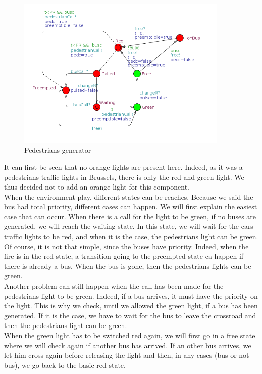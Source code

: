 \begin{figure}[!ht]\label{fig:crosswalk}
  \centering
    \includegraphics[width=0.9\textwidth]{picture/crosswalk.png}
    \caption{Pedestrians generator}
\end{figure}
\noindent It can first be seen that no orange lights are present here. Indeed, as it was a pedestrians traffic lights in Brussels, there is only the red and green light. We thus decided not to add an orange light for this component. \\
When the environment play, different states can be reaches. Because we said the bus had total priority, different cases can happen. We will first explain the easiest case that can occur. When there is a call for the light to be green, if no buses are generated, we will reach the waiting state. In this state, we will wait for the cars traffic lights to be red, and when it is the case, the pedestrians light can be green. Of course, it is not that simple, since the buses have priority. Indeed, when the fire is in the red state, a transition going to the preempted state ca happen if there is already a bus. When the bus is gone, then the pedestrians lights can be green.\\
Another problem can still happen when the call has been made for the pedestrians light to be green. Indeed, if a bus arrives, it must have the priority on the light. This is why we check, until we allowed the green light, if a bus has been generated. If it is the case, we have to wait for the bus to leave the crossroad and then the pedestrians light can be green. \\
When the green light has to be switched red again, we will first go in a free state where we will check again if another bus has arrived. If an other bus arrives, we let him cross again before releasing the light and then, in any cases (bus or not bus), we go back to the basic red state.
